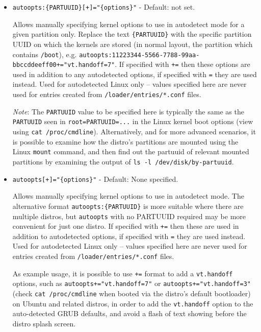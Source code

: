 \documentclass[]{article}
\begin{document}
\begin{itemize}
  \item \texttt{autoopts:\{PARTUUID\}[+]="\{options\}"} - Default: not set. \medskip

  Allows manually specifying kernel options to use in autodetect mode for a given partition only.
  Replace the text \texttt{\{PARTUUID\}} with the specific partition UUID on which the kernels are stored
  (in normal layout, the partition which contains \texttt{/boot}),
  e.g. \texttt{autoopts:11223344-5566-7788-99aa-bbccddeeff00+="vt.handoff=7"}.
  If specified with \texttt{+=} then these options are used in addition to any autodetected options, if specified
  with \texttt{=} they are used instead. Used for autodetected Linux only -- values specified here are never
  used for entries created from \texttt{/loader/entries/*.conf} files.
  \medskip

  \emph{Note}: The \texttt{PARTUUID} value to be specified here is typically the same as the \texttt{PARTUUID}
  seen in \texttt{root=PARTUUID=...} in the Linux kernel boot options (view using
  \texttt{cat /proc/cmdline}). Alternatively, and
  for more advanced scenarios, it is possible to examine how the distro's partitions are mounted using the
  Linux \texttt{mount} command, and then find out the partuuid of relevant mounted partitions by examining the
  output of \texttt{ls -l /dev/disk/by-partuuid}. \medskip

  \item \texttt{autoopts[+]="\{options\}"} - Default: None specified. \medskip

  Allows manually specifying kernel options to use in autodetect mode. The alternative format \texttt{autoopts:\{PARTUUID\}}
  is more suitable where there are multiple distros, but \texttt{autoopts} with no PARTUUID required may be more
  convenient for just one distro.
  If specified with \texttt{+=} then these are used in addition to autodetected options, if specified
  with \texttt{=} they are used instead. Used for autodetected Linux only -- values specified here are never
  used for entries created from \texttt{/loader/entries/*.conf} files.
  \medskip

  As example usage, it is possible to use \texttt{+=} format to add
  a \texttt{vt.handoff} options, such as \texttt{autoopts+="vt.handoff=7"} or \texttt{autoopts+="vt.handoff=3"}
  (check \texttt{cat /proc/cmdline} when booted via the distro's default bootloader) on Ubuntu and related distros,
  in order to add the \texttt{vt.handoff} option to the auto-detected GRUB defaults, and avoid a flash of text
  showing before the distro splash screen.
  \medskip
\end{itemize}
\end{document}
